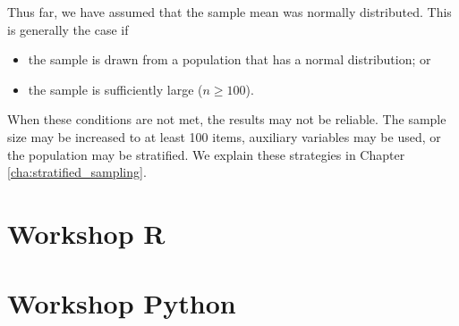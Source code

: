 Thus far, we have assumed that the sample mean was normally distributed. This is generally the case if
\begin{itemize}
\item the sample is drawn from a population that has a normal distribution; or
\item the sample is sufficiently large  ($n \geq 100$).
\end{itemize}

When these conditions are not met, the results may not be reliable. The sample size may be increased to at least 100 items, auxiliary variables may be used, or the population may be stratified. We explain these strategies in Chapter \ref{cha:stratified_sampling}.


\section{Workshop R} %
\label{sec:workshop03}




\section{Workshop Python} %
\label{sec:workshop03_python}



